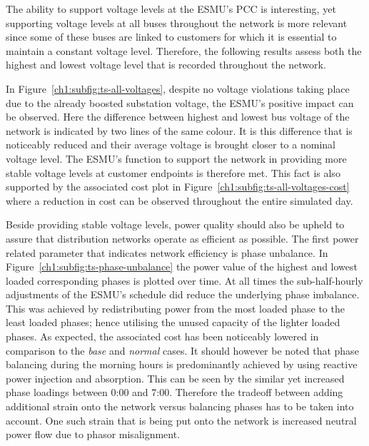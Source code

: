 The ability to support voltage levels at the ESMU's PCC is interesting, yet supporting voltage levels at all buses throughout the network is more relevant since some of these buses are linked to customers for which it is essential to maintain a constant voltage level.
Therefore, the following results assess both the highest and lowest voltage level that is recorded throughout the network.



In Figure~\ref{ch1:subfig:ts-all-voltages}, despite no voltage violations taking place due to the already boosted substation voltage, the ESMU's positive impact can be observed.
Here the difference between highest and lowest bus voltage of the network is indicated by two lines of the same colour.
It is this difference that is noticeably reduced and their average voltage is brought closer to a nominal voltage level.
The ESMU's function to support the network in providing more stable voltage levels at customer endpoints is therefore met.
This fact is also supported by the associated cost plot in Figure~\ref{ch1:subfig:ts-all-voltages-cost} where a reduction in cost can be observed throughout the entire simulated day.



Beside providing stable voltage levels, power quality should also be upheld to assure that distribution networks operate as efficient as possible.
The first power related parameter that indicates network efficiency is phase unbalance.
In Figure~\ref{ch1:subfig:ts-phase-unbalance} the power value of the highest and lowest loaded corresponding phases is plotted over time.
At all times the sub-half-hourly adjustments of the ESMU's schedule did reduce the underlying phase imbalance.
This was achieved by redistributing power from the most loaded phase to the least loaded phases; hence utilising the unused capacity of the lighter loaded phases.
As expected, the associated cost has been noticeably lowered in comparison to the \textit{base} and \textit{normal} cases.
It should however be noted that phase balancing during the morning hours is predominantly achieved by using reactive power injection and absorption.
This can be seen by the similar yet increased phase loadings between 0:00 and 7:00.
Therefore the tradeoff between adding additional strain onto the network versus balancing phases has to be taken into account.
One such strain that is being put onto the network is increased neutral power flow due to phasor misalignment.

